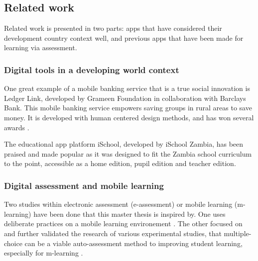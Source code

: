 \subsection{Related work}

Related work is presented in two parts: apps that have considered their development country context well, and previous apps that have been made for learning via assessment.

\subsubsection{Digital tools in a developing world context}

One great example of a mobile banking service that is a true social innovation is Ledger Link, developed by Grameen Foundation in collaboration with Barclays Bank. This mobile banking service empowers saving groups in rural areas to save money. It is developed with human centered design methods, and has won several awards \citep{nissar}.

The educational app platform iSchool, developed by iSchool Zambia, has been praised and made popular as it was designed to fit the Zambia school curriculum to the point, accessible as a home edition, pupil edition and teacher edition.

\subsubsection{Digital assessment and mobile learning}

Two studies within electronic assessment (e-assessment) or mobile learning (m-learning) have been done that this master thesis is inspired by. One uses deliberate practices on a mobile learning environement \citep{yengin}. The other focused on and further validated the research of various experimental studies, that multiple-choice can be a viable auto-assessment method to improving student learning, especially for m-learning \citep{de-marcos}.
